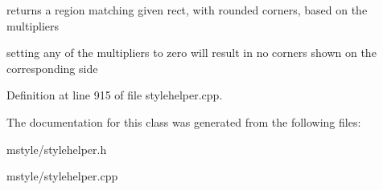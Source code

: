 returns a region matching given rect, with rounded corners, based on the multipliers 

setting any of the multipliers to zero will result in no corners shown on the corresponding side 

Definition at line 915 of file stylehelper.\+cpp.



The documentation for this class was generated from the following files\+:\begin{DoxyCompactItemize}
\item 
mstyle/stylehelper.\+h\item 
mstyle/stylehelper.\+cpp\end{DoxyCompactItemize}
